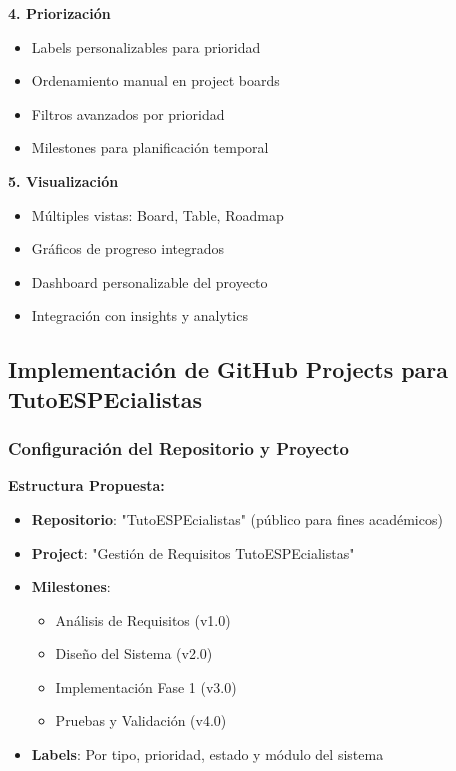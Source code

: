 \documentclass[12pt,a4paper]{article}
\begin{document}
\textbf{4. Priorización}
\begin{itemize}
    \item Labels personalizables para prioridad
    \item Ordenamiento manual en project boards
    \item Filtros avanzados por prioridad
    \item Milestones para planificación temporal
\end{itemize}

\textbf{5. Visualización}
\begin{itemize}
    \item Múltiples vistas: Board, Table, Roadmap
    \item Gráficos de progreso integrados
    \item Dashboard personalizable del proyecto
    \item Integración con insights y analytics
\end{itemize}

\subsection{Implementación de GitHub Projects para TutoESPEcialistas}

\subsubsection{Configuración del Repositorio y Proyecto}

\textbf{Estructura Propuesta:}
\begin{itemize}
    \item \textbf{Repositorio}: "TutoESPEcialistas" (público para fines académicos)
    \item \textbf{Project}: "Gestión de Requisitos TutoESPEcialistas"
    \item \textbf{Milestones}: 
        \begin{itemize}
            \item Análisis de Requisitos (v1.0)
            \item Diseño del Sistema (v2.0)
            \item Implementación Fase 1 (v3.0)
            \item Pruebas y Validación (v4.0)
        \end{itemize}
    \item \textbf{Labels}: Por tipo, prioridad, estado y módulo del sistema
\end{itemize}
\end{document}
